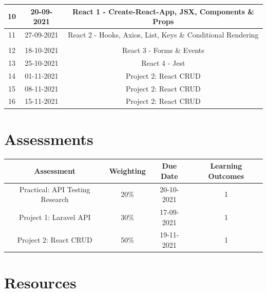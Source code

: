 \documentclass{article}
\begin{document}
\begin{tabular}{|c|c|c|c|}
	\footnotesize 10      & \footnotesize 20-09-2021 & \multicolumn{2}{c|}{\footnotesize React 1 - Create-React-App, JSX, Components \& Props} \\ \hline
	\footnotesize 11     & \footnotesize 27-09-2021 & \multicolumn{2}{c|}{\footnotesize React 2 - Hooks, Axios, List, Keys \& Conditional Rendering} \\ \hline
	\rowcolor{yellow} \multicolumn{4}{|c|}{\footnotesize Mid Term Break}                    \\ \hline
	\footnotesize 12     & \footnotesize 18-10-2021 & \multicolumn{2}{c|}{\footnotesize React 3 - Forms \& Events}     \\ \hline
	\footnotesize 13     & \footnotesize 25-10-2021 & \multicolumn{2}{c|}{\footnotesize React 4 - Jest}    \\ \hline
	\footnotesize 14     & \footnotesize 01-11-2021 & \multicolumn{2}{c|}{\footnotesize Project 2: React CRUD}     \\ \hline
	\footnotesize 15     & \footnotesize 08-11-2021 & \multicolumn{2}{c|}{\footnotesize Project 2: React CRUD}     \\ \hline
	\footnotesize 16     & \footnotesize 15-11-2021 & \multicolumn{2}{c|}{\footnotesize Project 2: React CRUD}     \\ \hline
\end{tabular}

\section*{Assessments}
\renewcommand{\arraystretch}{1.5}
\begin{tabular}{|c|c|c|c|}
	\hline
	\textbf{Assessment}                                & \textbf{Weighting} & \textbf{Due Date} & \textbf{Learning Outcomes} \\ \hline 
	\small Practical: API Testing Research                      & \small 20\%        & \small 20-10-2021 & \small 1                   \\ \hline
	\small Project 1: Laravel API                       & \small 30\%        & \small 17-09-2021 & \small 1                   \\ \hline
	\small Project 2: React CRUD                       & \small 50\%        & \small 19-11-2021 & \small 1                   \\ \hline 
\end{tabular} 

\section*{Resources}
\end{document}
